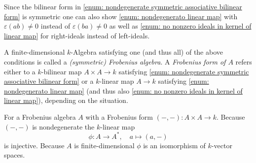 \begin{remark}
  Since the bilinear form in \ref{enum: nondegenerate symmetric associative bilinear form} is symmetric one can also show \ref{enum: nondegenerato linear map} with $\varepsilon(ab) \neq 0$ instead of $\varepsilon(ba) \neq 0$ as well as \ref{enum: no nonzero ideals in kernel of linear map} for right-ideals instead of left-ideals.
\end{remark}


\begin{definition}
  A finite-dimensional $k$-Algebra satisfying one (and thus all) of the above conditions is called a \emph{(symmetric) Frobenius algebra}.
  A \emph{Frobenius form of $A$} refers either to a $k$-bilinear map $A \times A \to k$ satisfying \ref{enum: nondegenerate symmetric associative bilinear form} or a $k$-linear map $A \to k$ satisfying \ref{enum: nondegenerato linear map} (and thus also \ref{enum: no nonzero ideals in kernel of linear map}), depending on the situation.
\end{definition}


\begin{remark}
  For a Frobenius algebra $A$ with a Frobenius form $(-,-) \colon A \times A \to k$.
  Because $(-,-)$ is nondegenerate the $k$-linear map
  \[
            \phi
    \colon  A
    \to     A^*,
    \quad   a
    \mapsto (a,-)
  \]
  is injective.
  Because $A$ is finite-dimensional $\phi$ is an isomorphism of $k$-vector spaces.
\end{remark}


